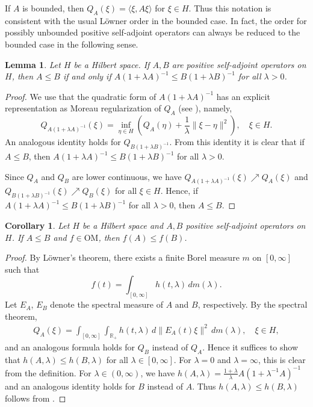 \documentclass[a4paper,12pt]{amsart}
\newcommand{\norm}[1]{\lVert#1\rVert}
\newcommand{\OM}{\mathrm{OM}}
\newcommand{\IR}{\mathbb R}
\theoremstyle{plain}
\newtheorem{corollary}[proposition]{Corollary}
\newtheorem{lemma}[proposition]{Lemma}
\theoremstyle{remark}
\theoremstyle{definition}
\begin{document}
If $A$ is bounded, then $Q_A(\xi)=\langle \xi,A\xi\rangle$ for $\xi\in H$. Thus this notation is consistent with the usual Löwner order in the bounded case. In fact, the order for possibly unbounded positive self-adjoint operators can always be reduced to the bounded case in the following sense.

\begin{lemma}\label{lem:Lowner_bdd}
    Let $H$ be a Hilbert space. If $A,B$ are positive self-adjoint operators on $H$, then $A\leq B$ if and only if $A(1+\lambda A)^{-1}\leq B(1+\lambda B)^{-1}$ for all $\lambda>0$.
\end{lemma}
\begin{proof}
    We use that the quadratic form of $A(1+\lambda A)^{-1}$ has an explicit representation as Moreau regularization of $Q_A$ (see ), namely,
    \begin{equation*}
        Q_{A(1+\lambda A)^{-1}}(\xi)=\inf_{\eta\in H}(Q_A(\eta)+\frac 1 \lambda\norm{\xi-\eta}^2),\quad \xi\in H.
    \end{equation*}
    An analogous identity holds for $Q_{B(1+\lambda B)^{-1}}$. From this identity it is clear that if $A\leq B$, then $A(1+\lambda A)^{-1}\leq B(1+\lambda B)^{-1}$ for all $\lambda>0$.
    
    Since $Q_A$ and $Q_B$ are lower continuous, we have $Q_{A(1+\lambda A)^{-1}}(\xi)\nearrow Q_A(\xi)$ and $Q_{B(1+\lambda B)^{-1}}(\xi)\nearrow Q_B(\xi)$ for all $\xi\in H$. Hence, if $A(1+\lambda A)^{-1}\leq B(1+\lambda B)^{-1}$ for all $\lambda>0$, then $A\leq B$.
\end{proof}

\begin{corollary}
    Let $H$ be a Hilbert space and $A,B$ positive self-adjoint operators on $H$. If $A\leq B$ and $f\in\OM$, then $f(A)\leq f(B)$.
\end{corollary}
\begin{proof}
    By Löwner's theorem, there exists a finite Borel measure $m$ on $[0,\infty]$ such that
    \begin{equation*}
        f(t)=\int_{[0,\infty]}h(t,\lambda)\,dm(\lambda).
    \end{equation*}
    Let $E_A$, $E_B$ denote the spectral measure of $A$ and $B$, respectively. By the spectral theorem,
    \begin{align*}
        Q_A(\xi)=\int_{[0,\infty]}\int_{\IR_+}h(t,\lambda)\,d\norm{E_A(t)\xi}^2\,dm(\lambda),\quad \xi\in H,
    \end{align*}
    and an analogous formula holds for $Q_B$ instead of $Q_A$. Hence it suffices to show that $h(A,\lambda)\leq h(B,\lambda)$ for all $\lambda\in [0,\infty]$. For $\lambda=0$ and $\lambda=\infty$, this is clear from the definition. For $\lambda\in (0,\infty)$, we have $h(A,\lambda)=\frac{1+\lambda}{\lambda}A(1+\lambda^{-1}A)^{-1}$ and an analogous identity holds for $B$ instead of $A$. Thus $h(A,\lambda)\leq h(B,\lambda)$ follows from .
\end{proof}
\end{document}
